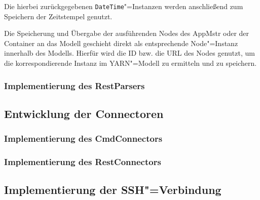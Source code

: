 Die hierbei zurückgegebenen \texttt{DateTime}"=Instanzen werden anschließend zum Speichern der Zeitstempel genutzt.

Die Speicherung und Übergabe der ausführenden Nodes des \ac{AppMstr} oder der Container an das Modell geschieht direkt als entsprechende Node"=Instanz innerhalb des Modells.
Hierfür wird die ID bzw. die URL des Nodes genutzt, um die korrespondierende Instanz im \ac{YARN}"=Modell zu ermitteln und zu speichern.

\subsubsection{Implementierung des RestParsers}
\label{subsubsec:implRestParser}

\subsection{Entwicklung der Connectoren}
\label{subsec:implementedConnectors}

\subsubsection{Implementierung des CmdConnectors}
\label{subsubsec:implCmdConnector}

\subsubsection{Implementierung des RestConnectors}
\label{subsubsec:implRestConnector}

\subsection{Implementierung der SSH"=Verbindung}
\label{subsec:sshConnection}

